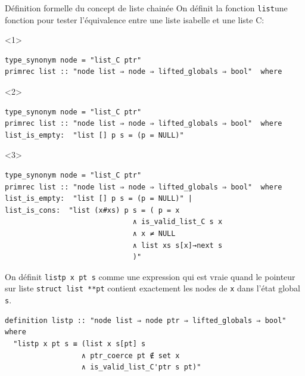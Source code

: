 \documentclass[hyperref={pdfpagelabels=false}]{beamer}
\begin{document}
\begin{frame}[fragile]{Définition formelle du concept de liste chainée}
  On définit la fonction \texttt{list}une fonction pour tester l'équivalence entre une liste isabelle et une liste C:
  \vfill
  \begin{onlyenv}<1>
    \begin{lstlisting}
type_synonym node = "list_C ptr"
primrec list :: "node list ⇒ node ⇒ lifted_globals ⇒ bool"  where
    \end{lstlisting}
  \end{onlyenv}
  \begin{onlyenv}<2>
    \begin{lstlisting}
type_synonym node = "list_C ptr"
primrec list :: "node list ⇒ node ⇒ lifted_globals ⇒ bool"  where
list_is_empty:  "list [] p s = (p = NULL)"
    \end{lstlisting}
  \end{onlyenv}
  \begin{onlyenv}<3>
    \begin{lstlisting}
type_synonym node = "list_C ptr"
primrec list :: "node list ⇒ node ⇒ lifted_globals ⇒ bool"  where
list_is_empty:  "list [] p s = (p = NULL)" |
list_is_cons:  "list (x#xs) p s = ( p = x
                              ∧ is_valid_list_C s x
                              ∧ x ≠ NULL
                              ∧ list xs s[x]→next s
                              )"
    \end{lstlisting}
  \end{onlyenv}
\end{frame}

\begin{frame}[fragile]
  On définit \texttt{listp x pt s} comme une expression qui est vraie quand le pointeur sur liste \texttt{struct list **pt} contient exactement les nodes de \texttt{x} dans l'état global \texttt{s}.
  \vfill
  \begin{lstlisting}
definition listp :: "node list ⇒ node ptr ⇒ lifted_globals ⇒ bool" where
  "listp x pt s ≡ (list x s[pt] s
                  ∧ ptr_coerce pt ∉ set x
                  ∧ is_valid_list_C'ptr s pt)"
  \end{lstlisting}
\end{frame}
\end{document}
